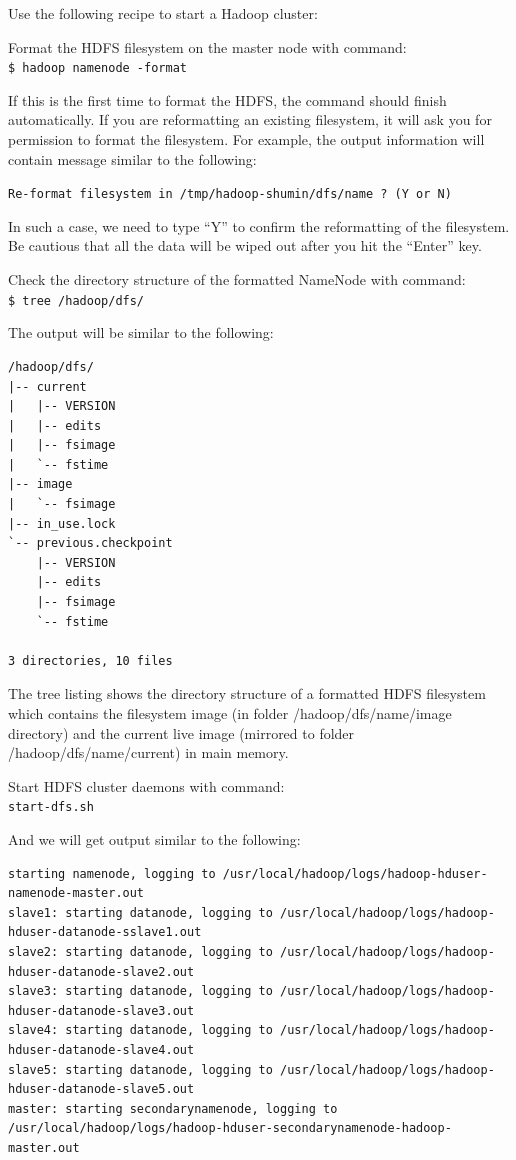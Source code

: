 Use the following recipe to start a Hadoop cluster:

Format the HDFS filesystem on the master node with command: \\
\verb|$ hadoop namenode -format|

If this is the first time to format the HDFS, the command should finish automatically. If you are reformatting an existing filesystem, it will ask you for permission to format the filesystem. For example, the output information will contain message similar to the following:

\verb|Re-format filesystem in /tmp/hadoop-shumin/dfs/name ? (Y or N)|

In such a case, we need to type ``Y'' to confirm the reformatting of the filesystem. Be cautious that all the data will be wiped out after you hit the ``Enter'' key.

Check the directory structure of the formatted NameNode with command: \\
\verb|$ tree /hadoop/dfs/|

The output will be similar to the following: \\
\begin{verbatim}
/hadoop/dfs/
|-- current
|   |-- VERSION
|   |-- edits
|   |-- fsimage
|   `-- fstime
|-- image
|   `-- fsimage
|-- in_use.lock
`-- previous.checkpoint
    |-- VERSION
    |-- edits
    |-- fsimage
    `-- fstime

3 directories, 10 files
\end{verbatim}

The tree listing shows the directory structure of a formatted HDFS filesystem which contains the filesystem image (in folder /hadoop/dfs/name/image directory) and the current live image (mirrored to folder /hadoop/dfs/name/current) in main memory.

Start HDFS cluster daemons with command: \\
\verb|start-dfs.sh|

And we will get output similar to the following:
\begin{verbatim}
starting namenode, logging to /usr/local/hadoop/logs/hadoop-hduser-namenode-master.out
slave1: starting datanode, logging to /usr/local/hadoop/logs/hadoop-hduser-datanode-sslave1.out
slave2: starting datanode, logging to /usr/local/hadoop/logs/hadoop-hduser-datanode-slave2.out
slave3: starting datanode, logging to /usr/local/hadoop/logs/hadoop-hduser-datanode-slave3.out
slave4: starting datanode, logging to /usr/local/hadoop/logs/hadoop-hduser-datanode-slave4.out
slave5: starting datanode, logging to /usr/local/hadoop/logs/hadoop-hduser-datanode-slave5.out
master: starting secondarynamenode, logging to /usr/local/hadoop/logs/hadoop-hduser-secondarynamenode-hadoop-master.out
\end{verbatim}

